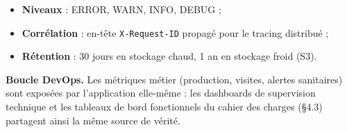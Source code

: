 \begin{itemize}
  \item \textbf{Niveaux} : ERROR, WARN, INFO, DEBUG ;
  \item \textbf{Corrélation} : en-tête \texttt{X-Request-ID} propagé pour le
        tracing distribué ;
  \item \textbf{Rétention} : 30 jours en stockage chaud, 1 an en stockage
        froid (S3).
\end{itemize}

\begin{encadre}
\textbf{Boucle DevOps.} Les métriques métier (production, visites, alertes
sanitaires) sont exposées par l'application elle-même : les dashboards de
supervision technique et les tableaux de bord fonctionnels du cahier des
charges (\S4.3) partagent ainsi la même source de vérité.
\end{encadre}
